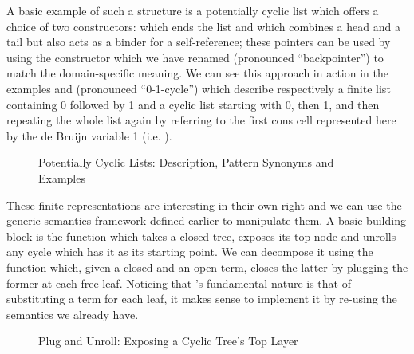 A basic example of such a structure is a potentially cyclic list which
offers a choice of two constructors: \AIC{[]} which ends the list and
\AIC{\_:\!:\_} which combines a head and a tail but also acts as a binder
for a self-reference; these pointers can be used by using the 
constructor which we have renamed  (pronounced ``backpointer'')
to match the domain-specific meaning.
We can see this approach in action in the examples
\AF{[0, 1]} and  (pronounced ``0-1-cycle'') which describe
respectively a finite list containing
0 followed by 1 and a cyclic list starting with 0, then 1, and then
repeating the whole list again by referring to the first cons cell
represented here by the de Bruijn variable 1 (i.e.  ).

\begin{figure}[h]
\begin{minipage}{0.55\textwidth}
\end{minipage}\hspace{2em}
\begin{minipage}{0.35\textwidth}
\end{minipage}
\caption{Potentially Cyclic Lists: Description, Pattern Synonyms and Examples}
\end{figure}

These finite representations are interesting in their own right
and we can use the generic semantics framework defined earlier
to manipulate them. A basic building block is the 
function which takes a closed tree, exposes its top node and
unrolls any cycle which has it as its starting point. We can
decompose it using the  function which, given a closed
and an open term, closes the latter by plugging the former at
each free  leaf. Noticing that 's fundamental nature
is that of substituting a term for each leaf, it makes sense to
implement it by re-using the  semantics we already have.

\begin{figure}[h]
\begin{minipage}{0.52\textwidth}
\end{minipage}\hspace{2em}
\begin{minipage}{0.43\textwidth}
\end{minipage}
\caption{Plug and Unroll: Exposing a Cyclic Tree's Top Layer}
\end{figure}

